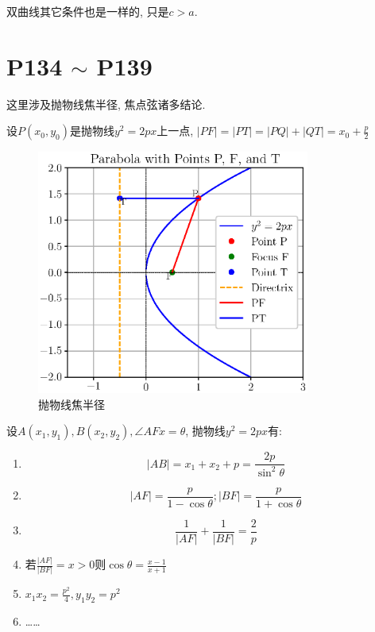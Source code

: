 \documentclass{book}
\begin{document}
    双曲线其它条件也是一样的, 只是$c>a$.

    \section{\textcolor[rgb]{0.11,0.65,0.52}{P134 $\sim$ P139}}

    这里涉及抛物线\textcolor[rgb]{0.38,0.11,0.2}{焦半径, 焦点弦}诸多结论.

    设$P\left( x_0,y_0 \right)$是抛物线$y^2=2px$上一点, $\displaystyle \left| PF \right|=\left| PT \right|=\left| PQ \right|+\left| QT \right|=x_0+\frac{p}{2}$
    \begin{figure}[htbp]
        \centering
        \includegraphics[width=0.8\textwidth]{img/ParabolaFocusRadius.eps}
        \caption{抛物线焦半径}
    \end{figure}

    设$A(x_1,y_1),B(x_2,y_2),\angle AFx=\theta$, 抛物线$y^2=2px$有:

    \begin{enumerate}
        \item $$\left| AB \right|=x_1+x_2+p=\frac{2p}{\sin^2\theta}$$
        \item $$\left| AF \right|=\frac{p}{1-\cos \theta};\left| BF \right|=\frac{p}{1+\cos \theta}$$
        \item $$\frac{1}{\left| AF \right|}+\frac{1}{\left| BF \right|}=\frac{2}{p}$$
        \item 若$\displaystyle \frac{\left| AF \right|}{\left| BF \right|}=x>0$则$\displaystyle \cos \theta = \frac{x-1}{x+1}$
        \item $\displaystyle x_1x_2=\frac{p^2}{4},y_1y_2=p^2$
        \item \dots\dots
    \end{enumerate}
\end{document}
